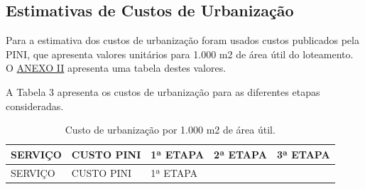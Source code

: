 \documentclass[
  10pt,
  a4paper]{article}
\begin{document}
\subsection{Estimativas de Custos de
Urbanização}\label{estimativas-de-custos-de-urbanizauxe7uxe3o}

Para a estimativa dos custos de urbanização foram usados custos
publicados pela PINI, que apresenta valores unitários para 1.000 m2 de
área útil do loteamento. O \hyperref[anexo-ii]{ANEXO II} apresenta uma
tabela destes valores.

A Tabela 3 apresenta os custos de urbanização para as diferentes etapas
consideradas.

\begin{longtable}[]{@{}
  >{\raggedright\arraybackslash}p{}
  >{\raggedleft\arraybackslash}p{}
  >{\raggedleft\arraybackslash}p{}
  >{\raggedleft\arraybackslash}p{}
  >{\raggedleft\arraybackslash}p{}@{}}
\caption{Custo de urbanização por 1.000 m2 de área útil.}\tabularnewline
\toprule\noalign{}
\begin{minipage}[b]{\linewidth}\raggedright
SERVIÇO
\end{minipage} & \begin{minipage}[b]{\linewidth}\raggedleft
CUSTO PINI
\end{minipage} & \begin{minipage}[b]{\linewidth}\raggedleft
1ª ETAPA
\end{minipage} & \begin{minipage}[b]{\linewidth}\raggedleft
2ª ETAPA
\end{minipage} & \begin{minipage}[b]{\linewidth}\raggedleft
3ª ETAPA
\end{minipage} \\
\midrule\noalign{}
\endfirsthead
\toprule\noalign{}
\begin{minipage}[b]{\linewidth}\raggedright
SERVIÇO
\end{minipage} & \begin{minipage}[b]{\linewidth}\raggedleft
CUSTO PINI
\end{minipage} & \begin{minipage}[b]{\linewidth}\raggedleft
1ª ETAPA
\end{minipage} & \begin{minipage}[b]{\linewidth}\raggedleft

\end{minipage}
\end{longtable}
\end{document}
